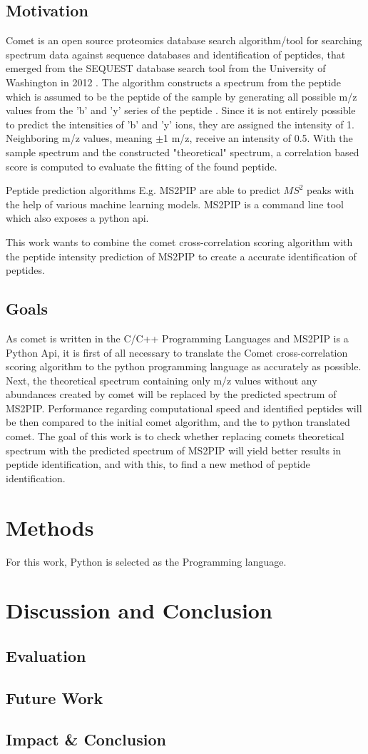 \documentclass[12pt]{article}
\begin{document}
\subsection{Motivation}
Comet is an open source proteomics database search algorithm/tool for searching spectrum data against sequence databases and identification of peptides, that emerged from the SEQUEST database search tool from the University of Washington in 2012 \cite{comet-search-tool}. The algorithm 
constructs a spectrum from the peptide which is assumed to be the peptide
of the sample by generating all possible m/z values from the 'b' and 'y' series of the peptide \cite{comet-first-paper}.  Since it is not entirely possible to predict the intensities of 'b' and 'y' ions, they are assigned the intensity of 1. Neighboring m/z values, meaning $\pm$1 m/z, receive an intensity of 0.5. With the sample spectrum and the constructed "theoretical" spectrum, a correlation based score is computed
to evaluate the fitting of the found peptide.

Peptide prediction algorithms E.g. MS2PIP\cite{ms2pip} are able to predict \(MS^2\) peaks with the help of various machine learning models.
MS2PIP is a command line tool which also exposes a python api.

This work wants to combine the comet cross-correlation scoring algorithm
with the peptide intensity prediction of MS2PIP to create a accurate identification of peptides.


\subsection{Goals}
As comet is written in the C/C++ Programming Languages and MS2PIP is a Python Api, it is first of all necessary to translate the Comet cross-correlation scoring algorithm to the python programming language as accurately as possible. Next, the theoretical spectrum containing only m/z values without any abundances created by comet will be replaced by the predicted spectrum of MS2PIP. Performance regarding computational speed and identified peptides will be then compared to the initial comet algorithm, and the to python translated comet.
The goal of this work is to check whether replacing comets theoretical spectrum with the predicted spectrum of MS2PIP will yield better results in peptide identification, and with this, to find a new method of peptide identification.

\section{Methods}
For this work, Python is selected as the Programming language. 

\section{Discussion and Conclusion}
\subsection{Evaluation}
\subsection{Future Work}
\subsection{Impact \& Conclusion}


\printbibliography
\end{document}
